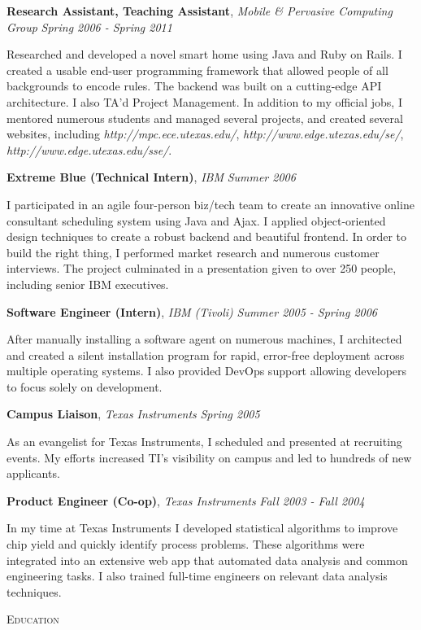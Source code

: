 \documentclass[9pt]{article}
\newenvironment{changemargin}[2]{%
  \begin{list}{}{%
    \setlength{\topsep}{0pt}%
    \setlength{\leftmargin}{#1}%
    \setlength{\rightmargin}{#2}%
    \setlength{\listparindent}{\parindent}%
    \setlength{\itemindent}{\parindent}%
    \setlength{\parsep}{\parskip}%
  }%
  \item[]}{\end{list}
}
\newcommand{\lineover}{
	\begin{changemargin}{-0.05in}{-0.05in}
		\vspace*{-8pt}
		\hrulefill \\
		\vspace*{-2pt}
	\end{changemargin}
}
\newcommand{\header}[1]{
	\begin{changemargin}{-0.5in}{-0.5in}
		\scshape{#1}\\
  	\lineover
	\end{changemargin}
}
\newcommand{\jobtitle}[3]{
	\textbf{#1}, \emph{#2} \hfill \emph{#3}\\
}
\newcommand{\jobdescription}[1]{
	\begin{changemargin}{0.15in}{0.15in}
    \smallskip
		{#1}
    \medskip
	\end{changemargin}
}
\newenvironment{body} {
	\vspace*{-16pt}
	\begin{changemargin}{-0.25in}{-0.5in}
  }	
	{\end{changemargin}
}
\begin{document}
\begin{body}
	\jobtitle{Research Assistant, Teaching Assistant}{Mobile \& Pervasive Computing Group}{Spring 2006 - Spring 2011}
  \jobdescription {
    Researched and developed a novel smart home using Java and Ruby on Rails. I created a usable end-user programming framework that allowed people of all backgrounds to encode rules. The backend was built on a cutting-edge API architecture. I also TA'd Project Management. In addition to my official jobs, I mentored numerous students and managed several projects, and created several websites, including \emph{http://mpc.ece.utexas.edu/}, \emph{http://www.edge.utexas.edu/se/}, \emph{http://www.edge.utexas.edu/sse/}.
  }

	\jobtitle{Extreme Blue (Technical Intern)}{IBM}{Summer 2006}
  \jobdescription {
    I participated in an agile four-person biz/tech team to create an innovative online consultant scheduling system using Java and Ajax. I applied object-oriented design techniques to create a robust backend and beautiful frontend. In order to build the right thing, I performed market research and numerous customer interviews. The project culminated in a presentation given to over 250 people, including senior IBM executives.
  }

	\jobtitle{Software Engineer (Intern)}{IBM (Tivoli)}{Summer 2005 - Spring 2006}
  \jobdescription {
    After manually installing a software agent on numerous machines, I architected and created a silent installation program for rapid, error-free deployment across multiple operating systems. I also provided DevOps support allowing developers to focus solely on development.
  }

	\jobtitle{Campus Liaison}{Texas Instruments}{Spring 2005}
  \jobdescription {
    As an evangelist for Texas Instruments, I scheduled and presented at recruiting events. My efforts increased TI's visibility on campus and led to hundreds of new applicants.
  }

	\jobtitle{Product Engineer (Co-op)}{Texas Instruments}{Fall 2003 - Fall 2004}
  \jobdescription {
    In my time at Texas Instruments I developed statistical algorithms to improve chip yield and quickly identify process problems. These algorithms were integrated into an extensive web app that automated data analysis and common engineering tasks. I also trained full-time engineers on relevant data analysis techniques.
  }

\end{body}

\medskip


\header{Education}
\end{document}
